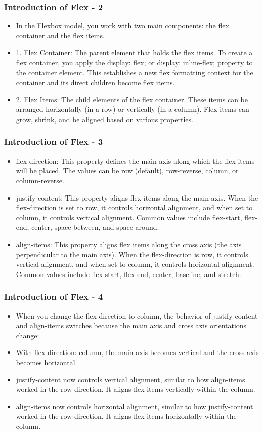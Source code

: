 \documentclass[aspectratio=169, table]{beamer}
\begin{document}
\begin{frame}
    \frametitle{Introduction of Flex - 2}
    \vskip1cm
    \begin{itemize}
        \item In the Flexbox model, you work with two main components: the flex container and the flex items.
	\item 1. Flex Container: The parent element that holds the flex items. To create a flex container, you apply the display: flex; or display: inline-flex; property to the container element. This establishes a new flex formatting context for the container and its direct children become flex items.
	\item 2. Flex Items: The child elements of the flex container. These items can be arranged horizontally (in a row) or vertically (in a column). Flex items can grow, shrink, and be aligned based on various properties.
    \end{itemize}
\end{frame}

\begin{frame}
    \frametitle{Introduction of Flex - 3}
    \vskip1cm
    \begin{itemize}
        \item flex-direction: This property defines the main axis along which the flex items will be placed. The values can be row (default), row-reverse, column, or column-reverse.
	\item justify-content: This property aligns flex items along the main axis. When the flex-direction is set to row, it controls horizontal alignment, and when set to column, it controls vertical alignment. Common values include flex-start, flex-end, center, space-between, and space-around.
	\item align-items: This property aligns flex items along the cross axis (the axis perpendicular to the main axis). When the flex-direction is row, it controls vertical alignment, and when set to column, it controls horizontal alignment. Common values include flex-start, flex-end, center, baseline, and stretch.
    \end{itemize}
\end{frame}

\begin{frame}
    \frametitle{Introduction of Flex - 4}
    \vskip1cm
    \begin{itemize}
        \item When you change the flex-direction to column, the behavior of justify-content and align-items switches because the main axis and cross axis orientations change:
	\item With flex-direction: column, the main axis becomes vertical and the cross axis becomes horizontal.
	\item justify-content now controls vertical alignment, similar to how align-items worked in the row direction. It aligns flex items vertically within the column.
	\item align-items now controls horizontal alignment, similar to how justify-content worked in the row direction. It aligns flex items horizontally within the column.
    \end{itemize}
\end{frame}
\end{document}
